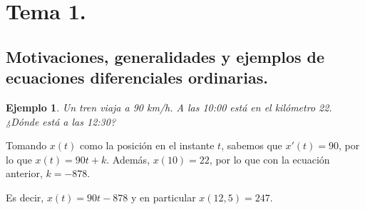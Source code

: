 \documentclass[11pt, a4paper,twoside]{article}
\makeatletter
\theoremstyle{theorem-style}  %
\renewenvironment{proof}[1][\proofname]{\par
	\pushQED{\qed}%
	\normalfont \topsep6\p@\@plus6\p@\relax
	\list{}{%
		\settowidth{\leftmargin}{\quad:\hskip\labelsep}%
		\setlength{\labelwidth}{0pt}%
		\setlength{\itemindent}{-\leftmargin}%
	}%
	\item[\hskip\labelsep\itshape#1\@addpunct{:}]\ignorespaces
}{%
	\popQED\endlist\@endpefalse
}
\theoremstyle{definition-style}
\theoremstyle{example-style}
\newtheorem{example}{Ejemplo}[section]
\let\oldsection\section
\def\section{\cleardoublepage\oldsection}
\makeatother
\begin{document}
\maketitle



\newpage
\tableofcontents
\newpage

\section{Tema 1.}

\subsection{Motivaciones, generalidades y ejemplos de ecuaciones diferenciales ordinarias.}
\begin{example}
	Un tren viaja a 90 km/h. A las 10:00 está en el kilómetro 22. ¿Dónde está a las 12:30?
\end{example}
\begin{proof}[Solución]
	Tomando $x(t)$ como la posición en el instante $t$, sabemos que $ x'(t)=90 $, por lo que $ x(t)=90t+k $. Además, $ x(10)=22 $, por lo que con la ecuación anterior, $ k=-878 $. 
	
	Es decir, $ x(t)=90t-878 $ y en particular $ x(12,5)= 247 $.
\end{proof}
\end{document}

